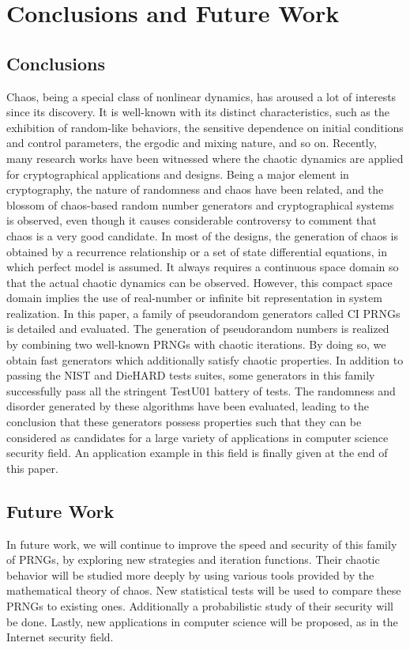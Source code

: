\chapter{Conclusions and Future Work}
\label{Conclusions and Future Work}
\minitoc

\section{Conclusions}
Chaos, being a special class of nonlinear dynamics, has aroused a lot of interests since its
discovery. It is well-known with its distinct characteristics, such as the exhibition of
random-like behaviors, the sensitive dependence on initial conditions and control parameters,
the ergodic and mixing nature, and so on.
Recently, many research works have been witnessed where the chaotic dynamics are
applied for cryptographical applications and designs. Being a major element in cryptography,
the nature of randomness and chaos have been related, and the blossom of chaos-based
random number generators and cryptographical systems is observed, even though it causes
considerable controversy to comment that chaos is a very good candidate.
In most of the designs, the generation of chaos is obtained by a recurrence relationship
or a set of state differential equations, in which perfect model is assumed. It always requires a
continuous space domain so that the actual chaotic dynamics can be observed. However, this
compact space domain implies the use of real-number or infinite bit representation in system
realization.
In this paper, a family of pseudorandom generators called CI PRNGs is detailed and evaluated. 
The generation of pseudorandom numbers is realized by combining two well-known PRNGs with chaotic iterations.
By doing so, we obtain fast generators which additionally satisfy chaotic properties.
In addition to passing the NIST and DieHARD tests suites, some generators in this family successfully pass all the stringent TestU01 battery of tests.
The randomness and disorder generated by these algorithms have been evaluated, leading to the conclusion that these generators possess properties such that they can be considered as candidates for a large variety of applications in computer science security field.
An application example in this field is finally given at the end of this paper.



\section{Future Work}
In future work, we will continue to improve the speed and security of this family of PRNGs, by exploring new strategies and iteration functions. 
Their chaotic behavior will be studied more deeply by using various tools provided by the mathematical theory of chaos. 
New statistical tests will be used to compare these PRNGs to existing ones.
Additionally a probabilistic study of their security will be done.
Lastly, new applications in computer science will be proposed, as in the Internet security field.